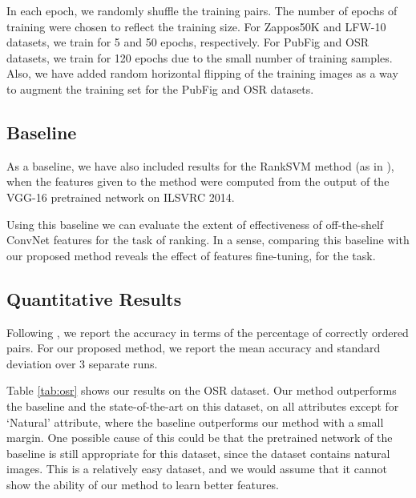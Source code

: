 In each epoch, we randomly shuffle the training pairs. The number of epochs of training were chosen to reflect the training size. For Zappos50K and LFW-10 datasets, we train for 5 and 50 epochs, respectively. For PubFig and OSR datasets, we train for 120 epochs due to the small number of training samples. Also, we have added random horizontal flipping of the training images as a way to augment the training set for the PubFig and OSR datasets.

\subsection{Baseline}

As a baseline, we have also included results for the RankSVM method (as in \cite{parikh2011}), when the features given to the method were computed from the output of the VGG-16 pretrained network on ILSVRC 2014. 

Using this baseline we can evaluate the extent of effectiveness of off-the-shelf ConvNet features \cite{offtheshelf}  for the task of ranking. In a sense, comparing this baseline with our proposed method reveals the effect of features fine-tuning, for the task. 

\subsection{Quantitative Results}

Following \cite{parikh2011, Yu2014, Sandeep_2014_CVPR}, we report the accuracy in terms of the percentage of correctly ordered pairs. For our proposed method, we report the mean accuracy and standard deviation over 3 separate runs. 

Table \ref{tab:osr} shows our results on the OSR dataset. Our method outperforms the baseline and the state-of-the-art on this dataset, on all attributes except for `Natural' attribute, where the baseline outperforms our method with a small margin. One possible cause of this could be that the pretrained network of the baseline is still appropriate for this dataset, since the dataset contains natural images. This is a relatively easy dataset, and we would assume that it cannot show the ability of our method to learn better features.

